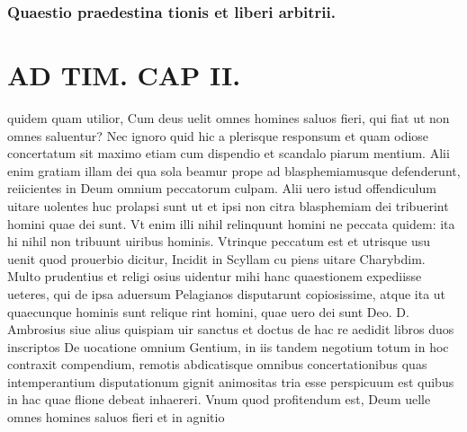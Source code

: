 \documentclass{article}
\begin{document}
\begin{pages}
\subsubsection*{Quaestio praedestina tionis et liberi arbitrii. }
\section*{AD TIM. CAP II. }
\marginpar{[ p.113 ]}\pstart quidem quam utilior, Cum deus uelit omnes homines saluos fieri, qui fiat ut non omnes saluentur? Nec ignoro quid hic a plerisque responsum et quam odiose concertatum sit maximo etiam cum dispendio et scandalo piarum mentium. Alii enim gratiam illam dei qua sola beamur prope ad blasphemiamusque defenderunt, reiicientes in Deum omnium peccatorum culpam. Alii uero istud offendiculum uitare uolentes huc prolapsi sunt ut et ipsi non citra blasphemiam dei tribuerint homini quae dei sunt. Vt enim illi nihil relinquunt homini ne peccata quidem: ita hi nihil non tribuunt uiribus hominis. Vtrinque peccatum est et utrisque usu uenit quod prouerbio dicitur, Incidit in Scyllam cu piens uitare Charybdim. Multo prudentius et religi osius uidentur mihi hanc quaestionem expediisse ueteres, qui de ipsa aduersum Pelagianos disputarunt copiosissime, atque ita ut quaecunque hominis sunt relique rint homini, quae uero dei sunt Deo. D. Ambrosius siue alius quispiam uir sanctus et doctus de hac re aedidit libros duos inscriptos De uocatione omnium Gentium, in iis tandem negotium totum in hoc contraxit compendium, remotis abdicatisque omnibus concertationibus quas intemperantium disputationum gignit animositas tria esse perspicuum est quibus in hac quae flione debeat inhaereri. Vnum quod profitendum est, Deum uelle omnes homines saluos fieri et in agnitio  \pend

\end{pages}
\end{document}
